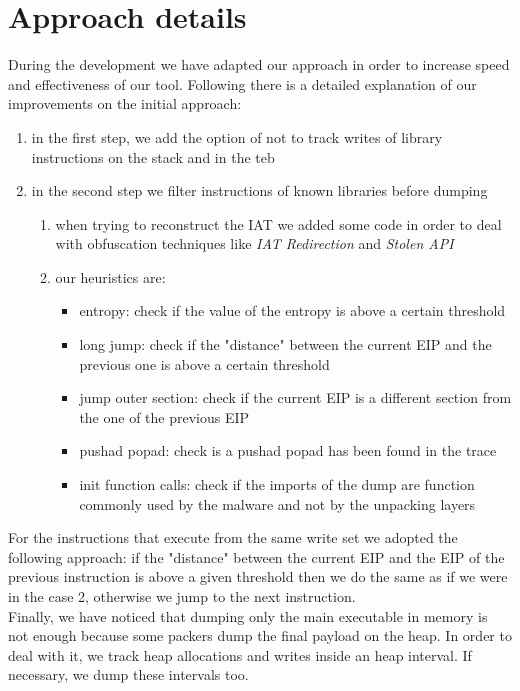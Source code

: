 \section{Approach details}
During the development we have adapted our approach in order to increase speed and effectiveness of our tool. Following there is a detailed explanation of our improvements on the initial approach:
\begin{enumerate}
\item in the first step, we add the option of not to track writes of library instructions on the stack and in the teb
\item in the second step we filter instructions of known libraries before dumping
	\begin{enumerate}
	\item when trying to reconstruct the IAT we added some code in order to deal with 			obfuscation techniques like \textit{IAT Redirection} and \textit{Stolen API}
	\item our heuristics are:
		\begin{itemize}
		\item entropy: check if the value of the entropy is above a certain threshold
		\item long jump: check if the "distance" between the current EIP and the previous 			one is above a certain threshold
		\item jump outer section: check if the current EIP is a different section from the 		one of the previous EIP
		\item pushad popad: check is a pushad popad has been found in the trace
		\item init function calls: check if the imports of the dump are function commonly 			 used by the malware and not by the unpacking layers
		\end{itemize}
	\end{enumerate}
\end{enumerate} 
For the instructions that execute from the same write set we adopted the following approach: if the "distance" between the current EIP and the EIP of the previous instruction is above a given threshold then we do the same as if we were in the case 2, otherwise we jump to the next instruction.\\
Finally, we have noticed that dumping only the main executable in memory is not enough because some packers dump the final payload on the heap. In order to deal with it, we track heap allocations and writes inside an heap interval. If necessary, we dump these intervals too.
